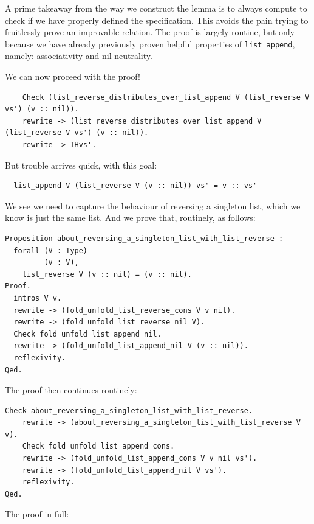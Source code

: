 \documentclass{article}
\begin{document}
A prime takeaway from the way we construct the lemma is to always compute to check if we have properly defined the specification. This avoids the pain trying to fruitlessly prove an improvable relation. The proof is largely routine, but only because we have already previously proven helpful properties of \texttt{list\_append}, namely: associativity and nil neutrality.

We can now proceed with the proof! 

\begin{lstlisting}
    Check (list_reverse_distributes_over_list_append V (list_reverse V vs') (v :: nil)).
    rewrite -> (list_reverse_distributes_over_list_append V (list_reverse V vs') (v :: nil)).
    rewrite -> IHvs'.
\end{lstlisting}  

But trouble arrives quick, with this goal:

\begin{lstlisting}
  list_append V (list_reverse V (v :: nil)) vs' = v :: vs'
\end{lstlisting}  

We see we need to capture the behaviour of reversing a singleton list, which we know is just the same list. And we prove that, routinely, as follows:

\begin{lstlisting}
Proposition about_reversing_a_singleton_list_with_list_reverse :
  forall (V : Type)
         (v : V),
    list_reverse V (v :: nil) = (v :: nil).
Proof.
  intros V v.
  rewrite -> (fold_unfold_list_reverse_cons V v nil).
  rewrite -> (fold_unfold_list_reverse_nil V).
  Check fold_unfold_list_append_nil.
  rewrite -> (fold_unfold_list_append_nil V (v :: nil)).
  reflexivity.
Qed.
\end{lstlisting}

The proof then continues routinely:

\begin{lstlisting}
Check about_reversing_a_singleton_list_with_list_reverse.
    rewrite -> (about_reversing_a_singleton_list_with_list_reverse V v).
    Check fold_unfold_list_append_cons.
    rewrite -> (fold_unfold_list_append_cons V v nil vs').
    rewrite -> (fold_unfold_list_append_nil V vs'). 
    reflexivity.
Qed.
\end{lstlisting}

The proof in full:
\end{document}
